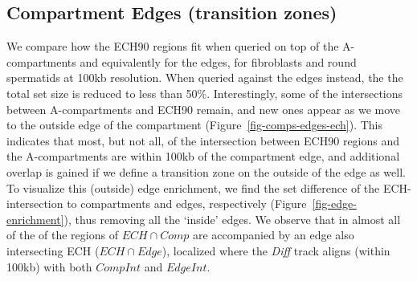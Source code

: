 \documentclass[
  11pt,
  a4paper,
]{scrbook}
\begin{document}
\subsection{Compartment Edges (transition
zones)}\label{compartment-edges-transition-zones}

We compare how the ECH90 regions fit when queried on top of the
A-compartments and equivalently for the edges, for fibroblasts and round
spermatids at 100kb resolution. When queried against the edges instead,
the the total set size is reduced to less than 50\%. Interestingly, some
of the intersections between A-compartments and ECH90 remain, and new
ones appear as we move to the outside edge of the compartment
(Figure~\ref{fig-comps-edges-ech}). This indicates that most, but not
all, of the intersection between ECH90 regions and the A-compartments
are within 100kb of the compartment edge, and additional overlap is
gained if we define a transition zone on the outside of the edge as
well. To visualize this (outside) edge enrichment, we find the set
difference of the ECH-intersection to compartments and edges,
respectively (Figure~\ref{fig-edge-enrichment}), thus removing all the
`inside' edges. We observe that in almost all of the of the regions of
\(ECH \cap Comp\) are accompanied by an edge also intersecting ECH
(\(ECH \cap Edge\)), localized where the \emph{Diff} track aligns
(within 100kb) with both \(CompInt\) and \(EdgeInt\).
\end{document}
